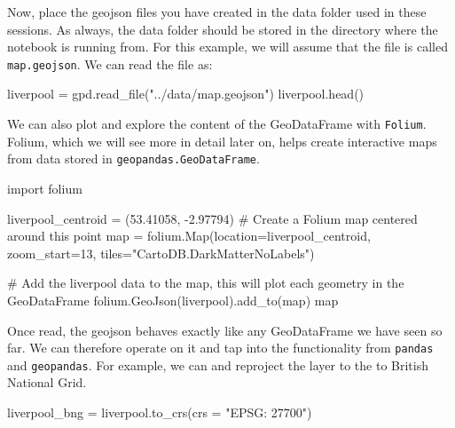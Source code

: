 \documentclass[
  letterpaper,
  DIV=11,
  numbers=noendperiod]{scrreprt}
\newenvironment{Shaded}{\begin{snugshade}}{\end{snugshade}}
\newcommand{\BuiltInTok}[1]{\textcolor[rgb]{0.00,0.23,0.31}{#1}}
\newcommand{\CommentTok}[1]{\textcolor[rgb]{0.37,0.37,0.37}{#1}}
\newcommand{\DecValTok}[1]{\textcolor[rgb]{0.68,0.00,0.00}{#1}}
\newcommand{\FloatTok}[1]{\textcolor[rgb]{0.68,0.00,0.00}{#1}}
\newcommand{\ImportTok}[1]{\textcolor[rgb]{0.00,0.46,0.62}{#1}}
\newcommand{\NormalTok}[1]{\textcolor[rgb]{0.00,0.23,0.31}{#1}}
\newcommand{\OperatorTok}[1]{\textcolor[rgb]{0.37,0.37,0.37}{#1}}
\newcommand{\StringTok}[1]{\textcolor[rgb]{0.13,0.47,0.30}{#1}}
\begin{document}
Now, place the geojson files you have created in the data folder used in
these sessions. As always, the data folder should be stored in the
directory where the notebook is running from. For this example, we will
assume that the file is called \texttt{map.geojson}. We can read the
file as:

\begin{Shaded}
\begin{Highlighting}[]
\NormalTok{liverpool }\OperatorTok{=}\NormalTok{ gpd.read\_file(}\StringTok{"../data/map.geojson"}\NormalTok{)}
\NormalTok{liverpool.head()}
\end{Highlighting}
\end{Shaded}

We can also plot and explore the content of the GeoDataFrame with
\texttt{Folium}. Folium, which we will see more in detail later on,
helps create interactive maps from data stored in
\texttt{geopandas.GeoDataFrame}.

\begin{Shaded}
\begin{Highlighting}[]
\ImportTok{import}\NormalTok{ folium }

\NormalTok{liverpool\_centroid }\OperatorTok{=}\NormalTok{ (}\FloatTok{53.41058}\NormalTok{, }\OperatorTok{{-}}\FloatTok{2.97794}\NormalTok{)}
\CommentTok{\# Create a Folium map centered around this point}
\BuiltInTok{map} \OperatorTok{=}\NormalTok{ folium.Map(location}\OperatorTok{=}\NormalTok{liverpool\_centroid, zoom\_start}\OperatorTok{=}\DecValTok{13}\NormalTok{, tiles}\OperatorTok{=}\StringTok{"CartoDB.DarkMatterNoLabels"}\NormalTok{)}

\CommentTok{\# Add the liverpool data to the map, this will plot each geometry in the GeoDataFrame}
\NormalTok{folium.GeoJson(liverpool).add\_to(}\BuiltInTok{map}\NormalTok{)}
\BuiltInTok{map}
\end{Highlighting}
\end{Shaded}

Once read, the geojson behaves exactly like any GeoDataFrame we have
seen so far. We can therefore operate on it and tap into the
functionality from \texttt{pandas} and \texttt{geopandas}. For example,
we can and reproject the layer to the to British National Grid.

\begin{Shaded}
\begin{Highlighting}[]
\NormalTok{liverpool\_bng }\OperatorTok{=}\NormalTok{ liverpool.to\_crs(crs }\OperatorTok{=} \StringTok{"EPSG: 27700"}\NormalTok{)}
\end{Highlighting}
\end{Shaded}
\end{document}
